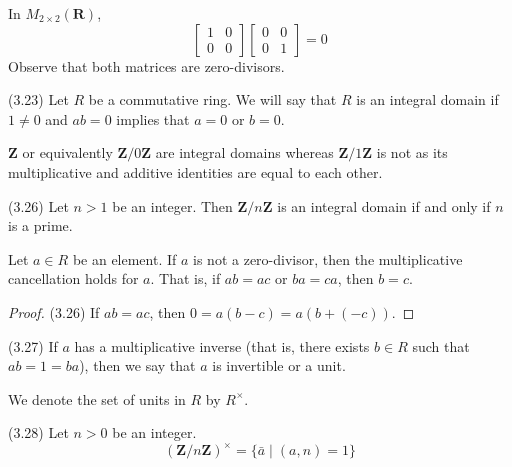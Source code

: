 \vspace{2ex}
\begin{ex}
In $M_{2\times 2}({\bm R})$, 
\[\begin{bmatrix}
	1&0\\0&0
\end{bmatrix}\begin{bmatrix}
	0&0\\0&1
\end{bmatrix}=0\]
Observe that both matrices are zero-divisors.
\end{ex}
\vspace{2ex}
\begin{defi}
 (3.23) Let $R$ be a commutative ring. We will say that $R$ is an integral domain if $1\ne 0$ and $ab=0$ implies that $a=0$ or $b=0$.
\end{defi}
\vspace{2ex}
\begin{ex}
${\bm Z}$ or equivalently ${\bm Z}/0{\bm Z}$ are integral domains whereas ${\bm Z}/1{\bm Z}$ is not as its multiplicative and additive identities are equal to each other.
\end{ex}
\vspace{2ex}
\begin{ex}
 (3.26) Let $n>1$ be an integer. Then ${\bm Z}/n{\bm Z}$ is an integral domain if and only if $n$ is a prime.
\end{ex}
\vspace{2ex}
\begin{prop}
Let $a\in R$ be an element. If $a$ is not a zero-divisor, then the multiplicative cancellation holds for $a$. That is, if $ab=ac$ or $ba=ca$, then $b=c$. 
\end{prop}
\vspace{2ex}
\begin{proof}
 (3.26) If $ab=ac$, then $0=a(b-c)=a(b+(-c))$. 
\end{proof}
\vspace{2ex}
\begin{defi}
 (3.27) If $a$ has a multiplicative inverse (that is, there exists $b\in R$ such that $ab=1=ba$), then we say that $a$ is invertible or a unit.
\end{defi}
\vspace{2ex}
\begin{rmk}
We denote the set of units in $R$ by $R^{\times }$.
\end{rmk}
\vspace{2ex}
\begin{prop}
 (3.28) Let $n>0$ be an integer.
 \[({\bm Z}/n{\bm Z})^{\times }=\{\bar{a} \;|\; (a,n)=1\}\]
\end{prop}
